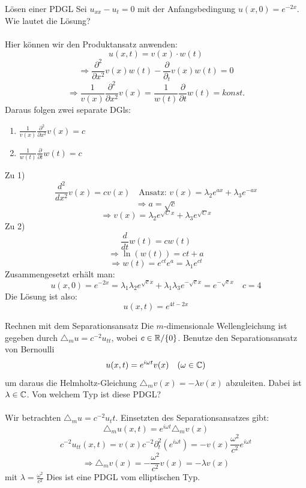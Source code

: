 \begin{Beispiel}{Lösen einer PDGL}
    Sei $u_{xx}-u_t=0$ mit der Anfangsbedingung $u(x,0)=e^{-2x}$. Wie lautet die Lösung? \\ \\
    Hier können wir den Produktansatz anwenden:
    $$u(x,t)=v(x)\cdot w(t)$$
    $$\Rightarrow \frac{\partial^2}{\partial x^2}v(x)w(t)-\frac{\partial}{\partial_t}v(x)w(t)=0$$
    $$\Rightarrow \frac{1}{v(x)}\frac{\partial^2}{\partial x^2}v(x)=\frac{1}{w(t)}\frac{\partial}{\partial t}w(t)=konst.$$
    Daraus folgen zwei separate DGls:
    \begin{enumerate}
        \item $\frac{1}{v(x)}\frac{\partial^2}{\partial x^2}v(x)=c$
        \item $\frac{1}{w(t)}\frac{\partial}{\partial t}w(t)=c$
    \end{enumerate}
    Zu 1)
    $$\frac{d^2}{dx^2}v(x)=cv(x) \quad \mbox{Ansatz: }v(x)=\lambda_2e^{ax}+\lambda_3e^{-ax}$$
    $$\Rightarrow a=\sqrt{c}$$
    $$\Rightarrow v(x)=\lambda_2 e^{\sqrt{C}x}+\lambda_3 e^{\sqrt{C}x}$$
    Zu 2)
    $$\frac{d}{dt}w(t)=cw(t)$$
    $$\Rightarrow \ln(w(t))=ct+a$$
    $$\Rightarrow w(t)=e^{ct}e^a=\lambda_1 e^{ct}$$
    Zusammengesetzt erhält man:
    $$u(x,0)=e^{-2x}=\lambda_1\lambda_2 e^{\sqrt{c}x}+\lambda_1\lambda_3e^{-\sqrt{c}x}=e^{-\sqrt{c}x} \quad c=4$$
    Die Lösung ist also:
    $$u(x,t)=e^{4t-2x}$$
\end{Beispiel}
\begin{Beispiel}{Rechnen mit dem Separationsansatz}
    Die $m$-dimensionale Wellengleichung ist gegeben durch $\triangle_m u = c^{-2}u_{tt}$, wobei $c\in \mathbb{R}/\{0\}$. Benutze den Separationsansatz von Bernoulli
    $$u(x,t)=e^{i\omega t}v(x) \quad (\omega\in \mathbb{C})$$
    um daraus die Helmholtz-Gleichung $\triangle_m v(x)=-\lambda v(x)$ abzuleiten. Dabei ist $\lambda\in \mathbb{C}$. Von welchem Typ ist diese PDGL? \\ \\
    Wir betrachten $\triangle_m u=c^{-2}u_tt$. Einsetzten des Separationsansatzes gibt:
    $$\triangle_m u(x,t)=e^{i\omega t}\triangle_m v(x)$$
    $$c^{-2}u_{tt}(x,t)=v(x)c^{-2}\partial_t^2(e^{i\omega t})=-v(x)\frac{\omega^2}{c^2}e^{i\omega t}$$
    $$\Rightarrow \triangle_m v(x)=-\frac{\omega^2}{c^2}v(x)=-\lambda v(x)$$
    mit $\lambda=\frac{\omega^2}{c^2}$
    Dies ist eine PDGL vom elliptischen Typ.
\end{Beispiel}